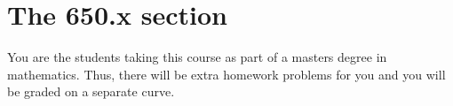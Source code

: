 \section*{The 650.x section}

You are the students taking this course as part of a masters degree in mathematics. Thus, there will be extra homework problems for you and you will be graded on a separate curve.